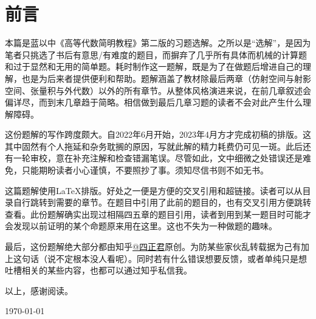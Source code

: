\section*{前言}
本篇是蓝以中《高等代数简明教程》第二版的习题选解。之所以是“选解”，是因为笔者只挑选了书后有意思/有难度的题目，而摒弃了几乎所有具体而机械的计算题和过于显然和无用的简单题。耗时制作这一题解，既是为了在做题后增进自己的理解，也是为后来者提供便利和帮助。题解涵盖了教材除最后两章（仿射空间与射影空间、张量积与外代数）以外的所有章节。从整体风格演进来说，在前几章叙述会偏详尽，而到末几章趋于简略。相信做到最后几章习题的读者不会对此产生什么理解障碍。

这份题解的写作跨度颇大。自2022年6月开始，2023年4月方才完成初稿的排版。这其中固然有个人拖延和杂务耽搁的原因，写就此解的精力耗费仍可见一斑。此后还有一轮审校，意在补充注解和检查错漏笔误。尽管如此，文中细微之处错误还是难免，只能期盼读者小心谨慎，不要照抄了事。须知尽信书则不如无书。

这篇题解使用{\LaTeX}排版。好处之一便是方便的交叉引用和超链接。读者可以从目录自行跳转到需要的章节。在题目中引用了此前的题目的，也有交叉引用方便跳转查看。此份题解确实出现过相隔四五章的题目引用，读者到用到某一题目时可能才会发现以前证明的某个命题原来用在这里。这也不失为一种做题的趣味。

最后，这份题解绝大部分都由知乎\href{https://www.zhihu.com/people/si-zheng-jun-15}{@四正君}原创。为防某些家伙乱转载据为己有加上这句话（说不定根本没人看呢）。同时若有什么错误想要反馈，或者单纯只是想吐槽相关的某些内容，也都可以通过知乎私信我。

以上，感谢阅读。

\begin{flushright}
    \kaishu
    \today
\end{flushright}